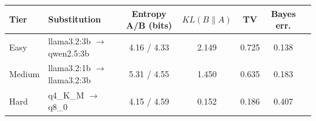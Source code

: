 \begin{tabular}{llccccc}
\toprule
Tier & Substitution & Entropy A/B (bits) & $KL(B\|A)$ & TV & Bayes err. \\
\midrule
Easy & llama3.2:3b $\rightarrow$ qwen2.5:3b & 4.16 / 4.33 & 2.149 & 0.725 & 0.138 \\
Medium & llama3.2:1b $\rightarrow$ llama3.2:3b & 5.31 / 4.55 & 1.450 & 0.635 & 0.183 \\
Hard & q4\_K\_M $\rightarrow$ q8\_0 & 4.15 / 4.59 & 0.152 & 0.186 & 0.407 \\
\bottomrule
\end{tabular}
